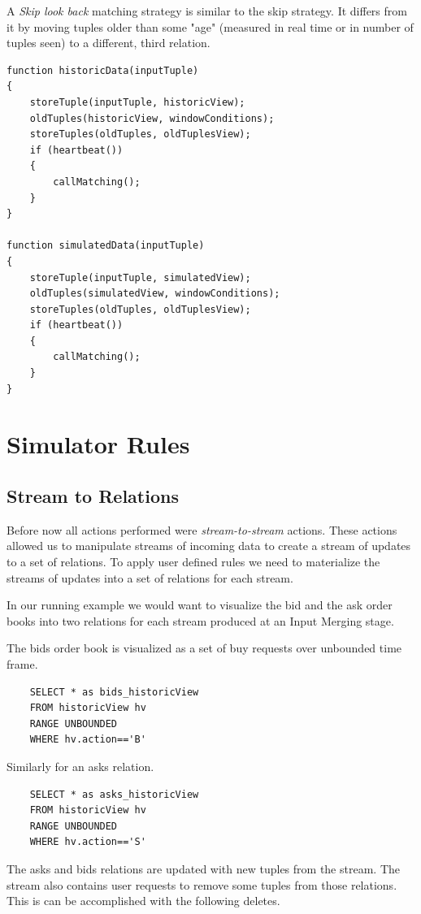 \documentclass{article}
\begin{document}
\noindent A \emph{Skip look back} matching strategy is similar to the skip strategy. It differs from it by moving tuples older than some "age" (measured in real time or in number of tuples seen) to a different, third relation.
\begin{verbatim}   
function historicData(inputTuple)
{
    storeTuple(inputTuple, historicView);
    oldTuples(historicView, windowConditions);
    storeTuples(oldTuples, oldTuplesView);
    if (heartbeat())
    {
        callMatching();
    }
}

function simulatedData(inputTuple)
{
    storeTuple(inputTuple, simulatedView);
    oldTuples(simulatedView, windowConditions);
    storeTuples(oldTuples, oldTuplesView);
    if (heartbeat())
    {
        callMatching();
    }
}
\end{verbatim}

\section{Simulator Rules}

\subsection{Stream to Relations}
Before now all actions performed were \emph{stream-to-stream} actions. These actions allowed us to manipulate streams of incoming data to create a stream of updates to a set of relations. To apply user defined rules we need to materialize the streams of updates into a set of relations for each stream. 

In our running example we would want to visualize the bid and the ask order books into two relations for each stream produced at an Input Merging stage.

The bids order book is visualized as a set of buy requests over unbounded time frame.

\begin{verbatim}  
    SELECT * as bids_historicView
    FROM historicView hv
    RANGE UNBOUNDED
    WHERE hv.action=='B'
\end{verbatim}

\noindent Similarly for an asks relation.

\begin{verbatim}  
    SELECT * as asks_historicView
    FROM historicView hv
    RANGE UNBOUNDED
    WHERE hv.action=='S'
\end{verbatim}

\noindent The asks and bids relations are updated with new tuples from the stream. The stream also contains user requests to remove some tuples from those relations. This is can be accomplished with the following deletes.
\end{document}
